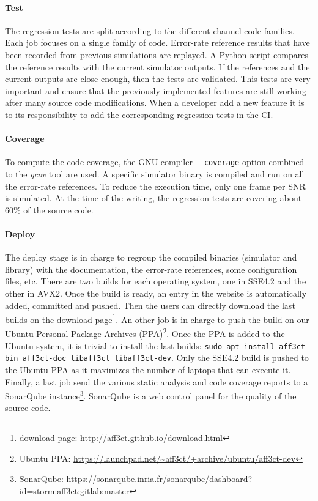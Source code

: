 \paragraph{Test}

The regression tests are split according to the different channel code families.
Each job focuses on a single family of code. Error-rate reference results that
have been recorded from previous simulations are replayed. A Python script
compares the reference results with the current simulator outputs. If the
references and the current outputs are close enough, then the tests are
validated. This tests are very important and ensure that the previously
implemented features are still working after many source code modifications.
When a developer add a new feature it is to its responsibility to add the
corresponding regression tests in the CI.

\paragraph{Coverage}

To compute the code coverage, the GNU compiler \verb|--coverage| option combined
to the \emph{gcov} tool are used. A specific \AFFECT simulator binary is
compiled and run on all the error-rate references. To reduce the execution time,
only one frame per SNR is simulated. At the time of the writing, the regression
tests are covering about 60\% of the \AFFECT source code.

\paragraph{Deploy}

The deploy stage is in charge to regroup the \AFFECT compiled binaries
(simulator and library) with the documentation, the error-rate references, some
configuration files, etc. There are two builds for each operating system, one in
SSE4.2 and the other in AVX2. Once the build is ready, an entry in the \AFFECT
website is automatically added, committed and pushed. Then the users can
directly download the last builds on the \AFFECT download page\footnote{\AFFECT
download page: \url{http://aff3ct.github.io/download.html}}. An other job is in
charge to push the \AFFECT build on our Ubuntu Personal Package Archives
(PPA)\footnote{\AFFECT Ubuntu PPA: \url{https://launchpad.net/~aff3ct/+archive/ubuntu/aff3ct-dev}}.
Once the \AFFECT PPA is added to the Ubuntu system, it is trivial to install the
last \AFFECT builds:
\verb|sudo apt install aff3ct-bin aff3ct-doc libaff3ct libaff3ct-dev|. Only
the SSE4.2 build is pushed to the Ubuntu PPA as it maximizes the number of
laptops that can execute it. Finally, a last job send the various static
analysis and code coverage reports to a SonarQube instance\footnote{\AFFECT
SonarQube: \url{https://sonarqube.inria.fr/sonarqube/dashboard?id=storm:aff3ct:gitlab:master}}.
SonarQube is a web control panel for the quality of the source code.

